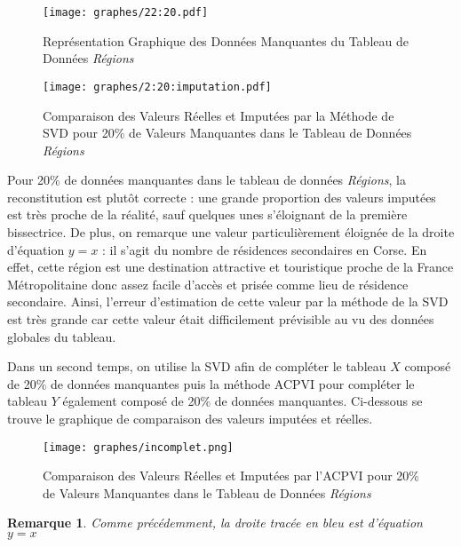 \documentclass[12pt, openany, fleqn, french]{article}
\newtheorem*{remark}{Remarque}
\begin{document}
\begin{center}
\begin{figure}[H]
\centering
  \texttt{[image: graphes/22:20.pdf]}
  \caption{Représentation Graphique des Données Manquantes du Tableau de Données \textit{Régions}}
\end{figure}
\end{center}

\begin{center}
\begin{figure}[H]
\centering
  \texttt{[image: graphes/2:20:imputation.pdf]}
  \caption{Comparaison des Valeurs Réelles et Imputées par la Méthode de SVD pour 20\% de Valeurs Manquantes dans le Tableau de Données \textit{Régions}}
\end{figure}
\end{center}

Pour 20\% de données manquantes dans le tableau de données \textit{Régions}, la reconstitution est plutôt correcte : une grande proportion des valeurs imputées est très proche de la réalité, sauf quelques unes s'éloignant de la première bissectrice.
De plus, on remarque une valeur particulièrement éloignée de la droite d'équation $y=x$ : il s'agit du nombre de résidences secondaires en Corse. En effet, cette région est une destination attractive et touristique proche de la France Métropolitaine donc assez facile d'accès et prisée comme lieu de résidence secondaire. Ainsi, l'erreur d'estimation de cette valeur par la méthode de la SVD est très grande car cette valeur était difficilement prévisible au vu des données globales du tableau.

Dans un second temps, on utilise la SVD afin de compléter le tableau $X$ composé de 20\% de données manquantes puis la méthode ACPVI pour compléter le tableau $Y$ également composé de 20\% de données manquantes. Ci-dessous se trouve le graphique de comparaison des valeurs imputées et réelles.

\begin{center}
\begin{figure}[H]
\centering
  \texttt{[image: graphes/incomplet.png]}
  \caption{Comparaison des Valeurs Réelles et Imputées par l'ACPVI pour 20\% de Valeurs Manquantes dans le Tableau de Données \textit{Régions}}
\end{figure}
\end{center}

\begin{remark}
    Comme précédemment, la droite tracée en bleu est d'équation $y=x$
\end{remark}
\end{document}
